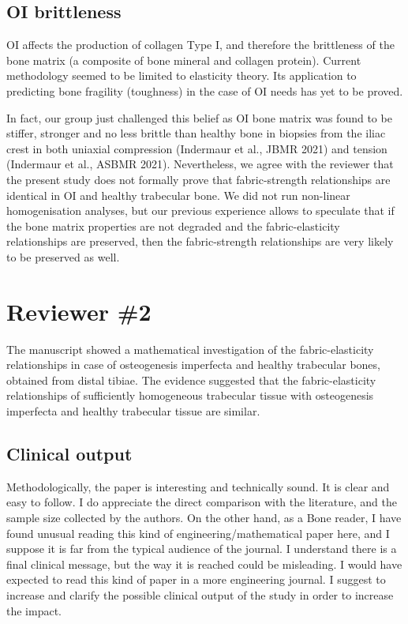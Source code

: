 \documentclass{AR2RC}
\begin{document}
\newpage
\subsection{OI brittleness}

\RC OI affects the production of collagen Type I, and therefore the brittleness of the bone matrix (a composite of bone mineral and collagen protein). Current methodology seemed to be limited to elasticity theory. Its application to predicting bone fragility (toughness) in the case of OI needs has yet to be proved.

\AR In fact, our group just challenged this belief as OI bone matrix was found to be stiffer, stronger and no less brittle than healthy bone in biopsies from the iliac crest in both uniaxial compression (Indermaur et al., JBMR 2021) and tension (Indermaur et al., ASBMR 2021). Nevertheless, we agree with the reviewer that the present study does not formally prove that fabric-strength relationships are identical in OI and healthy trabecular bone. We did not run non-linear homogenisation analyses, but our previous experience allows to speculate that if the bone matrix properties are not degraded and the fabric-elasticity relationships are preserved, then the fabric-strength relationships are very likely to be preserved as well.

%
%
%
%
%
%
\newpage
\section{Reviewer \#2}

\RC The manuscript showed a mathematical investigation of the fabric-elasticity relationships in case of osteogenesis imperfecta and healthy trabecular bones, obtained from distal tibiae. The evidence suggested that the fabric-elasticity relationships of sufficiently homogeneous trabecular tissue with osteogenesis imperfecta and healthy trabecular tissue are similar.

\subsection{Clinical output}

\RC Methodologically, the paper is interesting and technically sound. It is clear and easy to follow. I do appreciate the direct comparison with the literature, and the sample size collected by the authors. On the other hand, as a Bone reader, I have found unusual reading this kind of engineering/mathematical paper here, and I suppose it is far from the typical audience of the journal. I understand there is a final clinical message, but the way it is reached could be misleading. I would have expected to read this kind of paper in a more engineering journal. I suggest to increase and clarify the possible clinical output of the study in order to increase the impact.
\end{document}

